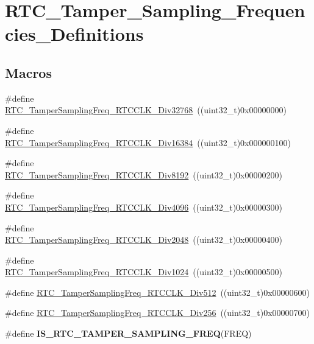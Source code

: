\hypertarget{group___r_t_c___tamper___sampling___frequencies___definitions}{\section{R\-T\-C\-\_\-\-Tamper\-\_\-\-Sampling\-\_\-\-Frequencies\-\_\-\-Definitions}
\label{group___r_t_c___tamper___sampling___frequencies___definitions}
}
\subsection*{Macros}
\begin{DoxyCompactItemize}
\item 
\#define \hyperlink{group___r_t_c___tamper___sampling___frequencies___definitions_ga8111f838f023394683814baebbd6a018}{R\-T\-C\-\_\-\-Tamper\-Sampling\-Freq\-\_\-\-R\-T\-C\-C\-L\-K\-\_\-\-Div32768}~((uint32\-\_\-t)0x00000000)
\item 
\#define \hyperlink{group___r_t_c___tamper___sampling___frequencies___definitions_ga4ecb6f350e1f309458365ac4d9d3775d}{R\-T\-C\-\_\-\-Tamper\-Sampling\-Freq\-\_\-\-R\-T\-C\-C\-L\-K\-\_\-\-Div16384}~((uint32\-\_\-t)0x000000100)
\item 
\#define \hyperlink{group___r_t_c___tamper___sampling___frequencies___definitions_ga63de5a2c30540bd2b0d6bd9074f1c650}{R\-T\-C\-\_\-\-Tamper\-Sampling\-Freq\-\_\-\-R\-T\-C\-C\-L\-K\-\_\-\-Div8192}~((uint32\-\_\-t)0x00000200)
\item 
\#define \hyperlink{group___r_t_c___tamper___sampling___frequencies___definitions_ga07cc43608fbf68df4159b0e4d759feeb}{R\-T\-C\-\_\-\-Tamper\-Sampling\-Freq\-\_\-\-R\-T\-C\-C\-L\-K\-\_\-\-Div4096}~((uint32\-\_\-t)0x00000300)
\item 
\#define \hyperlink{group___r_t_c___tamper___sampling___frequencies___definitions_ga4bc9217c856fc9e4dc15c83f826d67ba}{R\-T\-C\-\_\-\-Tamper\-Sampling\-Freq\-\_\-\-R\-T\-C\-C\-L\-K\-\_\-\-Div2048}~((uint32\-\_\-t)0x00000400)
\item 
\#define \hyperlink{group___r_t_c___tamper___sampling___frequencies___definitions_ga39c88776ba8589000ab94b6d5da5de90}{R\-T\-C\-\_\-\-Tamper\-Sampling\-Freq\-\_\-\-R\-T\-C\-C\-L\-K\-\_\-\-Div1024}~((uint32\-\_\-t)0x00000500)
\item 
\#define \hyperlink{group___r_t_c___tamper___sampling___frequencies___definitions_ga8528f31207c85d0ed76c9678f11e7e49}{R\-T\-C\-\_\-\-Tamper\-Sampling\-Freq\-\_\-\-R\-T\-C\-C\-L\-K\-\_\-\-Div512}~((uint32\-\_\-t)0x00000600)
\item 
\#define \hyperlink{group___r_t_c___tamper___sampling___frequencies___definitions_gad0f904e57e4d060e005a5bbceceb51f7}{R\-T\-C\-\_\-\-Tamper\-Sampling\-Freq\-\_\-\-R\-T\-C\-C\-L\-K\-\_\-\-Div256}~((uint32\-\_\-t)0x00000700)
\item 
\#define {\bfseries I\-S\-\_\-\-R\-T\-C\-\_\-\-T\-A\-M\-P\-E\-R\-\_\-\-S\-A\-M\-P\-L\-I\-N\-G\-\_\-\-F\-R\-E\-Q}(F\-R\-E\-Q)
\end{DoxyCompactItemize}



